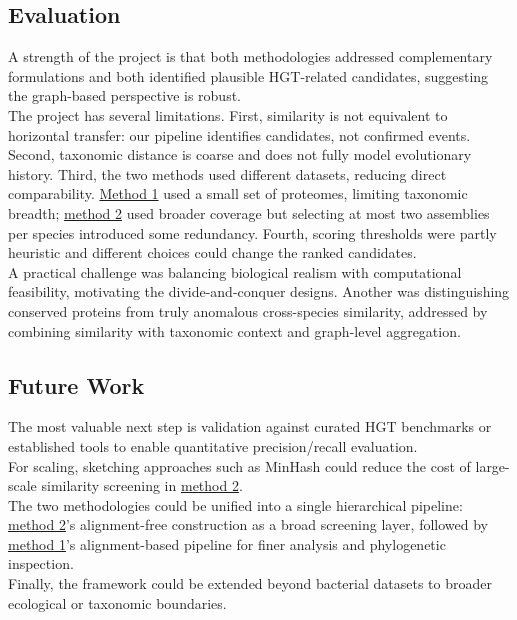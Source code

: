 \documentclass[11pt]{article}
\begin{document}
	\FloatBarrier
	
	\subsection{Evaluation}
	\label{subsec:evaluation}
	A strength of the project is that both methodologies addressed complementary formulations and both identified plausible HGT-related candidates, suggesting the graph-based perspective is robust.\\
	The project has several limitations. First, similarity is not equivalent to horizontal transfer: our pipeline identifies candidates, not confirmed events. Second, taxonomic distance is coarse and does not fully model evolutionary history. Third, the two methods used different datasets, reducing direct comparability. \hyperref[subsec:method1]{Method 1} used a small set of proteomes, limiting taxonomic breadth; \hyperref[subsec:method2]{method 2} used broader coverage but selecting at most two assemblies per species introduced some redundancy. Fourth, scoring thresholds were partly heuristic and different choices could change the ranked candidates.\\
	A practical challenge was balancing biological realism with computational feasibility, motivating the divide-and-conquer designs. Another was distinguishing conserved proteins from truly anomalous cross-species similarity, addressed by combining similarity with taxonomic context and graph-level aggregation.
	
	\subsection{Future Work}
	The most valuable next step is validation against curated HGT benchmarks or established tools to enable quantitative precision/recall evaluation.\\
	For scaling, sketching approaches such as MinHash \cite{Ondov2016} could reduce the cost of large-scale similarity screening in \hyperref[subsec:method2]{method 2}.\\
	The two methodologies could be unified into a single hierarchical pipeline: \hyperref[subsec:method2]{method 2}'s alignment-free construction as a broad screening layer, followed by \hyperref[subsec:method1]{method 1}'s alignment-based pipeline for finer analysis and phylogenetic inspection.\\
	Finally, the framework could be extended beyond bacterial datasets to broader ecological or taxonomic boundaries.
	
\end{document}
